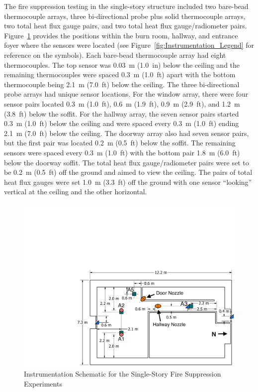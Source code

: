 \documentclass[12pt,oneside]{book}
\begin{document}
The fire suppression testing in the single-story structure included two bare-bead thermocouple arrays, three bi-directional probe plus solid thermocouple arrays, two total heat flux gauge pairs, and two total heat flux gauge/radiometer pairs. Figure~\ref{fig:Fire_Suppression_Instrumentation_Dimensions} provides the positions within the burn room, hallway, and entrance foyer where the sensors were located (see Figure~\ref{fig:Instrumentation_Legend} for reference on the symbols). Each bare-bead thermocouple array had eight thermocouples. The top sensor was 0.03~m (1.0~in) below the ceiling and the remaining thermocouples were spaced 0.3~m (1.0~ft) apart with the bottom thermocouple being 2.1~m (7.0~ft) below the ceiling. The three bi-directional probe arrays had unique sensor locations. For the window array, there were four sensor pairs located 0.3~m (1.0~ft), 0.6~m (1.9~ft), 0.9~m (2.9~ft), and 1.2~m (3.8~ft) below the soffit. For the hallway array, the seven sensor pairs started 0.3~m (1.0~ft) below the ceiling and were spaced every 0.3~m (1.0~ft) ending 2.1~m (7.0~ft) below the ceiling. The doorway array also had seven sensor pairs, but the first pair was located 0.2~m (0.5~ft) below the soffit. The remaining sensors were spaced every 0.3~m (1.0~ft) with the bottom pair 1.8~m (6.0~ft) below the doorway soffit. The total heat flux gauge/radiometer pairs were set to be 0.2~m (0.5~ft) off the ground and aimed to view the ceiling. The pairs of total heat flux gauges were set 1.0~m (3.3~ft) off the ground with one sensor ``looking'' vertical at the ceiling and the other horizontal.

\begin{figure}[!ht]
	\includegraphics[width=\columnwidth]{../Figures/Floor_Plans/PDFs/East_Structure/DelCo_2012_East_Structure_Instrumentation}
	\caption{Instrumentation Schematic for the Single-Story Fire Suppression Experiments}
	\label{fig:Fire_Suppression_Instrumentation_Dimensions}
\end{figure}
\end{document}
